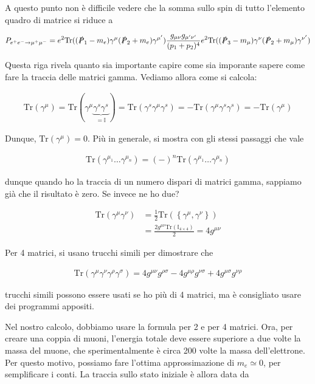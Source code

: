 \documentclass[11pt]{report}
\begin{document}
A questo punto non è difficile vedere che la somma sullo spin di tutto l'elemento quadro di matrice si riduce a 

\begin{align}
    P_{e^+e^- \rightarrow \mu^+\mu^-} = e^2\text{Tr}((\slashed{P}_1 - m_e)\gamma^{\mu}(\slashed{P}_2 +m_e)\gamma^{\mu'}) \frac{g_{\mu\nu}g_{\mu'\nu'}}{(p_1 + p_2)^4}e^2\text{Tr}((\slashed{P}_3 - m_\mu)\gamma^{\nu}(\slashed{P}_2 +m_\mu)\gamma^{\nu'})
\end{align}

Questa riga rivela quanto sia importante capire come sia imporante sapere come fare la traccia delle matrici gamma. Vediamo allora come si calcola: 

\begin{align}
    \text{Tr}(\gamma^\mu) = \text{Tr}(\gamma^\mu\underbrace{\gamma^s\gamma^s}_{= \mathbb{I}}) = \text{Tr}(\gamma^s\gamma^\mu\gamma^s) = -\text{Tr}(\gamma^\mu\gamma^s\gamma^s) = -\text{Tr}(\gamma^\mu) 
\end{align}

Dunque, \(\text{Tr}(\gamma^\mu) = 0\). Più in generale, si mostra con gli stessi passaggi che vale 

\begin{align}
    \text{Tr}(\gamma^{\mu_1}\ldots\gamma^{\mu_n}) = (-)^n\text{Tr}(\gamma^{\mu_1}\ldots\gamma^{\mu_n}) 
\end{align}

dunque quando ho la traccia di un numero dispari di matrici gamma, sappiamo già che il risultato è zero. Se invece ne ho due? 

\begin{align}
    \text{Tr}(\gamma^\mu\gamma^\nu) &= \frac{1}{2}\text{Tr}(\left\{\gamma^\mu, \gamma^\nu \right\}) \\
    &= \frac{2g^{\mu\nu}\text{Tr}(\mathbb{I}_{4\times 4})}{2} = 4g^{\mu\nu}
\end{align}

Per 4 matrici, si usano trucchi simili per dimostrare che 

\begin{align}
    \text{Tr}(\gamma^\mu\gamma^\nu \gamma^\rho\gamma^\sigma) = 4g^{\mu\nu}g^{\rho\sigma} - 4g^{\mu\rho}g^{\nu\sigma} + 4g^{\mu\sigma}g^{\nu\rho}
\end{align}

trucchi simili possono essere usati se ho più di 4 matrici, ma è consigliato usare dei programmi appositi. 

Nel nostro calcolo, dobbiamo usare la formula per 2 e per 4 matrici. Ora, per creare una coppia di muoni, l'energia totale deve essere superiore a due volte la massa del muone, che sperimentalmente è circa 200 volte la massa dell'elettrone. Per questo motivo, possiamo fare l'ottima approssimazione di \(m_e \simeq 0\), per semplificare i conti. La traccia sullo stato iniziale è allora data da 
\end{document}
